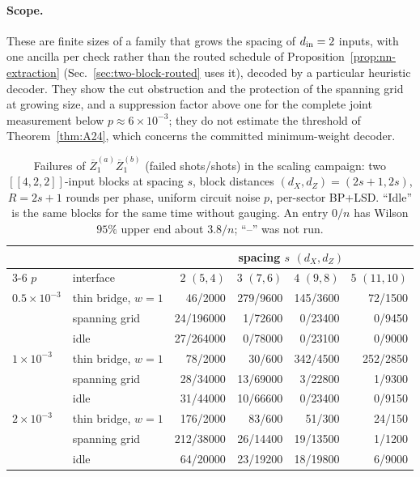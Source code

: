 \documentclass[aps,prx,reprint,superscriptaddress,nofootinbib,floatfix,longbibliography]{revtex4-2}
\theoremstyle{definition}
\begin{document}
\paragraph{Scope.}
These are finite sizes of a family that grows the spacing of $d_{\rm in}=2$
inputs, with one ancilla per check rather than the routed schedule of
Proposition~\ref{prop:nn-extraction} (Sec.~\ref{sec:two-block-routed} uses
it), decoded by a particular heuristic decoder.  They show the cut obstruction and the protection of the spanning
grid at growing size, and a suppression factor above one for the complete
joint measurement below $p\approx6\times10^{-3}$; they do not estimate the
threshold of Theorem~\ref{thm:A24}, which concerns the committed
minimum-weight decoder.

\begin{table}[t]
\caption{Failures of $\overline Z_1^{(a)}\overline Z_1^{(b)}$ (failed
shots/shots) in the scaling campaign: two $[[4,2,2]]$-input blocks at spacing
$s$, block distances $(d_X,d_Z)=(2s+1,2s)$, $R=2s+1$ rounds per phase,
uniform circuit noise $p$, per-sector BP+LSD.  ``Idle'' is the same blocks
for the same time without gauging.  An entry $0/n$ has Wilson $95\%$ upper end
about $3.8/n$; ``--'' was not run.}
\label{tab:two-block-scaling}
\centering
\small
\begin{tabular}{@{}llrrrr@{}}
\toprule
 & & \multicolumn{4}{c}{spacing $s$ \;$(d_X,d_Z)$} \\
\cmidrule(l){3-6}
$p$ & interface & $2$ \;$(5,4)$ & $3$ \;$(7,6)$ & $4$ \;$(9,8)$ & $5$ \;$(11,10)$ \\
\midrule
$0.5\times10^{-3}$ & thin bridge, $w=1$ & 46/2000 & 279/9600 & 145/3600 & 72/1500 \\
 & spanning grid & 24/196000 & 1/72600 & 0/23400 & 0/9450 \\
 & idle & 27/264000 & 0/78000 & 0/23100 & 0/9000 \\
\addlinespace[2pt]
$1\times10^{-3}$ & thin bridge, $w=1$ & 78/2000 & 30/600 & 342/4500 & 252/2850 \\
 & spanning grid & 28/34000 & 13/69000 & 3/22800 & 1/9300 \\
 & idle & 31/44000 & 10/66600 & 0/23400 & 0/9150 \\
\addlinespace[2pt]
$2\times10^{-3}$ & thin bridge, $w=1$ & 176/2000 & 83/600 & 51/300 & 24/150 \\
 & spanning grid & 212/38000 & 26/14400 & 19/13500 & 1/1200 \\
 & idle & 64/20000 & 23/19200 & 18/19800 & 6/9000 \\

\end{tabular}
\end{table}
\end{document}
